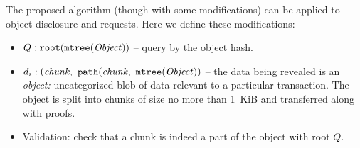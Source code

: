 The proposed algorithm (though with some modifications) can be applied to object disclosure and requests. Here we define these modifications:
\begin{itemize}
  \item $Q: \mathtt{root}(\mathtt{mtree}(\mathit{Object}))$ -- query by the object hash.
  \item $d_i: (\mathit{chunk},\ \Path(\mathit{chunk},\ \MerkleTree(\mathit{Object}))$ -- the data being revealed is an \textit{object:} uncategorized blob of data relevant to a particular transaction. The object is split into chunks of size no more than 1~KiB and transferred along with proofs.
  \item Validation: check that a chunk is indeed a part of the object with root $Q$.
\end{itemize}

